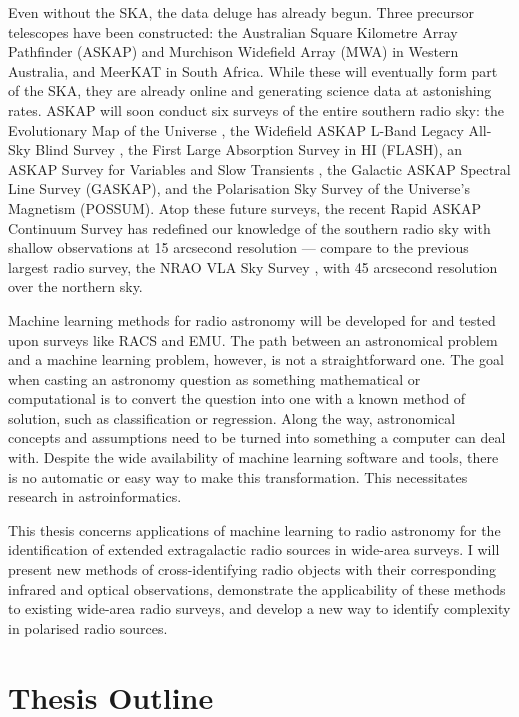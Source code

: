 Even without the SKA, the data deluge has already begun. Three precursor telescopes have been constructed: the Australian Square Kilometre Array Pathfinder (ASKAP) and Murchison Widefield Array (MWA) in Western Australia, and MeerKAT in South Africa. While these will eventually form part of the SKA, they are already online and generating science data at astonishing rates. ASKAP will soon conduct six surveys of the entire southern radio sky: the Evolutionary Map of the Universe \citep[EMU;][]{norris11,kapinska_emu_2020}, the Widefield ASKAP L-Band Legacy All-Sky Blind Survey \citep[WALLABY]{koribalski_wallaby_2020}, the First Large Absorption Survey in HI (FLASH), an ASKAP Survey for Variables and Slow Transients \citep[VAST;][]{murphy_vast_2013}, the Galactic ASKAP Spectral Line Survey (GASKAP), and the Polarisation Sky Survey of the Universe's Magnetism (POSSUM). Atop these future surveys, the recent Rapid ASKAP Continuum Survey \citep[RACS;][]{mcconnell_rapid_2020} has redefined our knowledge of the southern radio sky with shallow observations at 15 arcsecond resolution --- compare to the previous largest radio survey, the NRAO VLA Sky Survey \citep[NVSS;][]{condon98nvss}, with 45 arcsecond resolution over the northern sky.

Machine learning methods for radio astronomy will be developed for and tested upon surveys like RACS and EMU. The path between an astronomical problem and a machine learning problem, however, is not a straightforward one. The goal when casting an astronomy question as something mathematical or computational is to convert the question into one with a known method of solution, such as classification or regression. Along the way, astronomical concepts and assumptions need to be turned into something a computer can deal with. Despite the wide availability of machine learning software and tools, there is no automatic or easy way to make this transformation. This necessitates research in astroinformatics.

This thesis concerns applications of machine learning to radio astronomy for the identification of extended extragalactic radio sources in wide-area surveys. I will present new methods of cross-identifying radio objects with their corresponding infrared and optical observations, demonstrate the applicability of these methods to existing wide-area radio surveys, and develop a new way to identify complexity in polarised radio sources.

\section{Thesis Outline}
\label{sec:outline}

